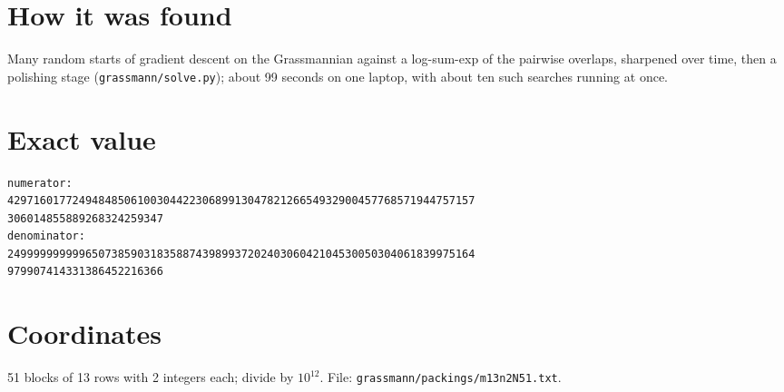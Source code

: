 \documentclass[11pt,a4paper]{article}
\begin{document}
\section{How it was found}
Many random starts of gradient descent on the Grassmannian against a log-sum-exp of the pairwise overlaps, sharpened over time, then a polishing stage (\texttt{grassmann/solve.py}); about 99 seconds on one laptop, with about ten such searches running at once.


\appendix
\section{Exact value}
{\small
\begin{verbatim}
numerator:
429716017724948485061003044223068991304782126654932900457768571944757157
306014855889268324259347
denominator:
249999999999650738590318358874398993720240306042104530050304061839975164
979907414331386452216366
\end{verbatim}}

\section{Coordinates}
51 blocks of 13 rows with 2 integers each; divide by $10^{12}$. File: \texttt{grassmann/packings/m13n2N51.txt}.
{\tiny
\begin{multicols}{4}
\end{multicols}}
\end{document}
